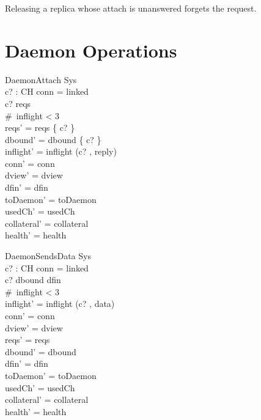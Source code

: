 \documentclass[a4paper,10pt,fleqn]{article}
\begin{document}
Releasing a replica whose attach is unanswered forgets the request.

\section{Daemon Operations}

\begin{schema}{DaemonAttach}
  \Delta Sys \\
  c? : CH
\where
  conn = linked \\
  c? \in reqs \\
  \#~inflight < 3 \\
  reqs' = reqs \setminus \{ c? \} \\
  dbound' = dbound \cup \{ c? \} \\
  inflight' = inflight \cat \langle (c? , reply) \rangle \\
  conn' = conn \\
  dview' = dview \\
  dfin' = dfin \\
  toDaemon' = toDaemon \\
  usedCh' = usedCh \\
  collateral' = collateral \\
  health' = health
\end{schema}

\begin{schema}{DaemonSendsData}
  \Delta Sys \\
  c? : CH
\where
  conn = linked \\
  c? \in dbound \setminus dfin \\
  \#~inflight < 3 \\
  inflight' = inflight \cat \langle (c? , data) \rangle \\
  conn' = conn \\
  dview' = dview \\
  reqs' = reqs \\
  dbound' = dbound \\
  dfin' = dfin \\
  toDaemon' = toDaemon \\
  usedCh' = usedCh \\
  collateral' = collateral \\
  health' = health
\end{schema}
\end{document}
